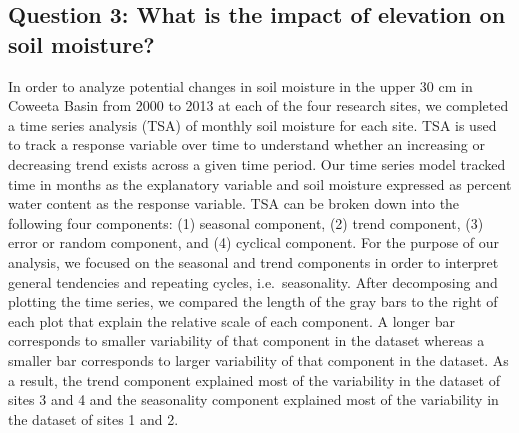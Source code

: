 \documentclass[
  12pt,
]{article}
\begin{document}
\hypertarget{question-3-what-is-the-impact-of-elevation-on-soil-moisture}{%
\subsection{Question 3: What is the impact of elevation on soil
moisture?}\label{question-3-what-is-the-impact-of-elevation-on-soil-moisture}}

In order to analyze potential changes in soil moisture in the upper 30
cm in Coweeta Basin from 2000 to 2013 at each of the four research
sites, we completed a time series analysis (TSA) of monthly soil
moisture for each site. TSA is used to track a response variable over
time to understand whether an increasing or decreasing trend exists
across a given time period. Our time series model tracked time in months
as the explanatory variable and soil moisture expressed as percent water
content as the response variable. TSA can be broken down into the
following four components: (1) seasonal component, (2) trend component,
(3) error or random component, and (4) cyclical component. For the
purpose of our analysis, we focused on the seasonal and trend components
in order to interpret general tendencies and repeating cycles,
i.e.~seasonality. After decomposing and plotting the time series, we
compared the length of the gray bars to the right of each plot that
explain the relative scale of each component. A longer bar corresponds
to smaller variability of that component in the dataset whereas a
smaller bar corresponds to larger variability of that component in the
dataset. As a result, the trend component explained most of the
variability in the dataset of sites 3 and 4 and the seasonality
component explained most of the variability in the dataset of sites 1
and 2.
\end{document}

